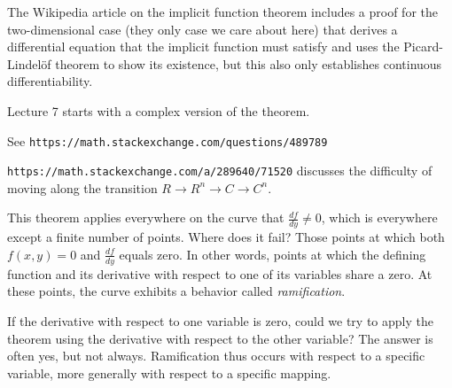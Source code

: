 The Wikipedia article on the implicit function theorem includes a
proof for the two-dimensional case (they only case we care about here)
that derives a differential equation that the implicit function
must satisfy and uses the Picard-Lindel\"of theorem to show its existence,
but this also only establishes continuous differentiability.

\cite{guillemin} Lecture 7 starts with a complex version of the theorem.

See {\tt https://math.stackexchange.com/questions/489789}

{\tt https://math.stackexchange.com/a/289640/71520} discusses the
difficulty of moving along the transition $R \to R^n \to C \to C^n$.

\endtheorem

This theorem applies everywhere on the curve that $\frac{df}{dy} \ne 0$,
which is everywhere except a finite number of points.  Where does it
fail?  Those points at which both $f(x,y)=0$ and $\frac{df}{dy}$
equals zero.  In other words, points at which the defining function
and its derivative with respect to one of its variables share
a zero.  At these points, the curve exhibits a behavior
called {\it ramification}.

If the derivative with respect to one variable is zero, could we try
to apply the theorem using the derivative with respect to the other
variable?  The answer is often yes, but not always.  Ramification thus
occurs with respect to a specific variable, more generally with
respect to a specific mapping.




